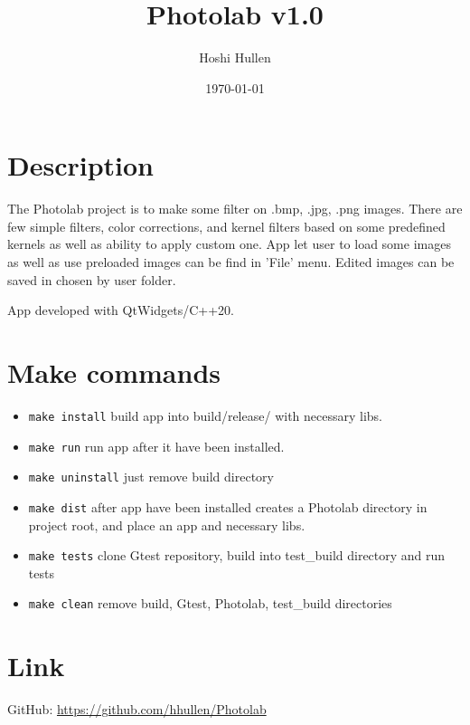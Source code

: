\documentclass[a4paper,12pt]{article}
\title{Photolab v1.0}
\author{Hoshi Hullen}
\date{\today}
\begin{document}
\maketitle

\tableofcontents
\newpage

\section{Description}

The Photolab project is to make some filter on .bmp, .jpg, .png images.
There are few simple filters, color corrections, and kernel filters based on some predefined kernels as well as ability to apply custom one. App let user to load some images as well as use preloaded images can be find in 'File' menu. Edited images can be saved in chosen by user folder.

App developed with QtWidgets/C++20.

\section{Make commands}

\begin{itemize}
    \item \texttt{make install} build app into build/release/ with necessary libs.
    \item \texttt{make run} run app after it have been installed.
    \item \texttt{make uninstall} just remove build directory
    \item \texttt{make dist} after app have been installed creates a Photolab directory in project root, and place an app and necessary libs.
    \item \texttt{make tests} clone Gtest repository, build into test_build directory and run tests
    \item \texttt{make clean} remove build, Gtest, Photolab, test_build directories
\end{itemize}

\section{Link}

GitHub: \url{https://github.com/hhullen/Photolab}
\end{document}
